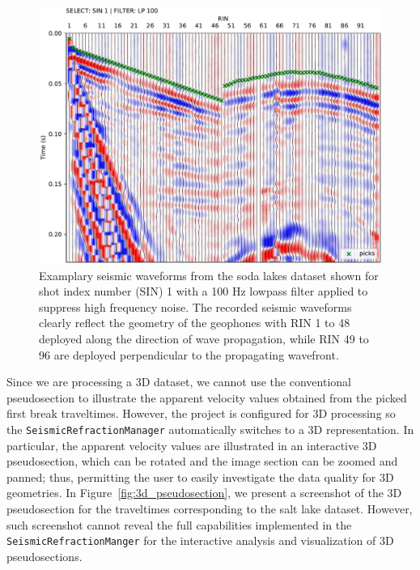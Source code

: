 \documentclass[a4paper,fleqn]{cas-sc}
\begin{document}
\begin{figure}
	\centering
	\includegraphics[width=.75\textwidth]{figures/sodalakes_sin1_lp100_picks_vd.pdf}
	\caption{Examplary seismic waveforms from the soda lakes dataset shown for shot index number (SIN) 1 with a 100 Hz lowpass filter applied to suppress high frequency noise. The recorded seismic waveforms clearly reflect the geometry of the geophones  with RIN 1 to 48 deployed along the direction of wave propagation, while RIN 49 to 96 are deployed perpendicular to the propagating wavefront.}
	\label{fig:3d_pickwindow}
\end{figure}

Since we are processing a 3D dataset, we cannot use the conventional pseudosection to illustrate the apparent velocity values obtained from the picked first break traveltimes.
However, the project is configured for 3D processing so the \texttt{SeismicRefractionManager} automatically switches to a 3D representation. In particular, the apparent velocity values are illustrated in an interactive 3D pseudosection, which can be rotated and the image section can be zoomed and panned; thus, permitting the user to easily investigate the data quality for 3D geometries. In Figure~\ref{fig:3d_pseudosection}, we present a screenshot of the 3D pseudosection for the traveltimes corresponding to the salt lake dataset. However, such screenshot cannot reveal the full capabilities implemented in the \texttt{SeismicRefractionManger} for the interactive analysis and visualization of 3D pseudosections.
\end{document}
